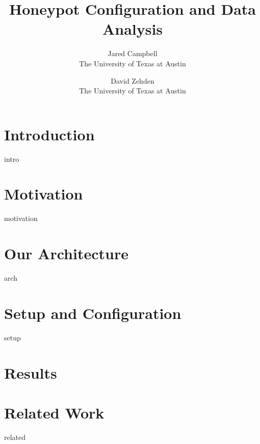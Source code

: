 \documentclass{sig-alternate}
\newcommand{\ignore}[1]{}
\begin{document}
\title{ Honeypot Configuration and Data Analysis }
\author{Jared Campbell\\The University of Texas at Austin  \and David Zehden\\The University of Texas at Austin}


\maketitle

\begin{abstract}
 
\end{abstract}

\section{Introduction}
\label{sec:intro}
 {intro}

\section{Motivation}
\label{sec:motivation}
 {motivation}

\ignore{Sometimes background is merged into motivation, and is not required separately.}

\section{Our Architecture}
\label{sec:arch}
 {arch}

\section{Setup and Configuration}
\label{sec:setup}
 {setup}

\section{Results}
\label{sec:results}


%

\section{Related Work}
\label{sec:related}
 {related}
\end{document}
